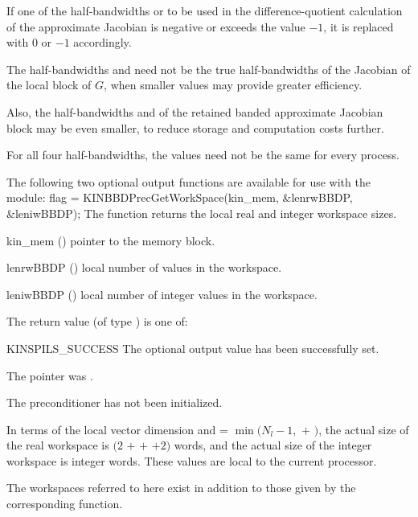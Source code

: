 {
  If one of the half-bandwidths  or  to be used in the
  difference-quotient calculation of the approximate Jacobian is negative
  or exceeds the value $-1$, it is replaced with $0$ or
  $-1$ accordingly.

  The half-bandwidths  and  need
  not be the true half-bandwidths of the Jacobian of the local block of $G$,    
  when smaller values may provide greater efficiency.

  Also, the half-bandwidths  and  of the retained
  banded approximate Jacobian block may be even smaller, to reduce
  storage and computation costs further.

  For all four half-bandwidths, the values need not be the same for
  every process.
}
The following two optional output functions are available for use with
the {\kinbbdpre} module:
{
  flag = KINBBDPrecGetWorkSpace(kin\_mem, \&lenrwBBDP, \&leniwBBDP);
}
{
  The function  returns the local
  {\kinbbdpre} real and integer workspace sizes.
}
{
  \begin{args}[lenrwBBDP]
  \item[kin\_mem] ()
    pointer to the {\kinsol} memory block.
  \item[lenrwBBDP] ()
    local number of  values in the {\kinbbdpre} workspace.
  \item[leniwBBDP] ()
    local number of integer values in the {\kinbbdpre} workspace.
  \end{args}
}
{
  The return value  (of type ) is one of:
  \begin{args}
  \item[KINSPILS\_SUCCESS] 
    The optional output value has been successfully set.
  \item[\id{KINSPILS\_MEM\_NULL}] 
    The  pointer was .
  \item[\Id{KINSPILS\_PMEM\_NULL}]
    The {\kinbbdpre} preconditioner has not been initialized.
  \end{args}
}
{
  In terms of the local vector dimension  and
   = $\min ( N_l - 1 ,$  $+$ $)$, the actual size
  of the real workspace is $(2$  $+$  $+$  $+2)$ 
   words, and the actual size of the integer workspace is
   integer words. These values are local to the current processor.

  The workspaces referred to here exist in addition to those given by the
  corresponding  function.
}
